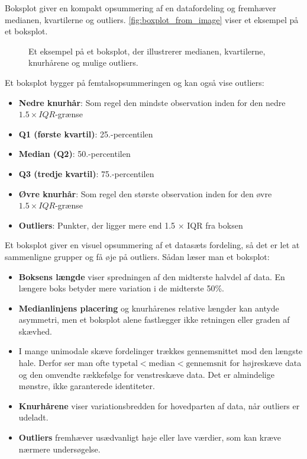 Boksplot giver en kompakt opsummering af en datafordeling og fremhæver medianen, kvartilerne og outliers. \autoref{fig:boxplot_from_image} viser et eksempel på et boksplot.

\begin{figure}[htbp]
    \centering
    \resizebox{0.7\textwidth}{!}{}
    \caption{Et eksempel på et boksplot, der illustrerer medianen, kvartilerne, knurhårene og mulige outliers.}
    \label{fig:boxplot_from_image}
\end{figure}


\begin{definition}
Et boksplot bygger på femtalsopsummeringen og kan også vise outliers:
\begin{itemize}
    \item \textbf{Nedre knurhår}: Som regel den mindste observation inden for den nedre $1.5\times IQR$-grænse
    \item \textbf{Q1 (første kvartil)}: 25.-percentilen
    \item \textbf{Median (Q2)}: 50.-percentilen
    \item \textbf{Q3 (tredje kvartil)}: 75.-percentilen
    \item \textbf{Øvre knurhår}: Som regel den største observation inden for den øvre $1.5\times IQR$-grænse
    \item \textbf{Outliers}: Punkter, der ligger mere end 1.5 × IQR fra boksen
\end{itemize}
\end{definition}

Et boksplot giver en visuel opsummering af et datasæts fordeling, så det er let at sammenligne grupper og få øje på outliers. Sådan læser man et boksplot:

\begin{itemize}
    \item \textbf{Boksens længde} viser spredningen af den midterste halvdel af data. En længere boks betyder mere variation i de midterste 50\%.
    \item \textbf{Medianlinjens placering} og knurhårenes relative længder kan antyde asymmetri, men et boksplot alene fastlægger ikke retningen eller graden af skævhed.
    \item I mange unimodale skæve fordelinger trækkes gennemsnittet mod den længste hale. Derfor ser man ofte $\text{typetal}<\text{median}<\text{gennemsnit}$ for højreskæve data og den omvendte rækkefølge for venstreskæve data. Det er almindelige mønstre, ikke garanterede identiteter.
    \item \textbf{Knurhårene} viser variationsbredden for hovedparten af data, når outliers er udeladt.
    \item \textbf{Outliers} fremhæver usædvanligt høje eller lave værdier, som kan kræve nærmere undersøgelse.
\end{itemize}


